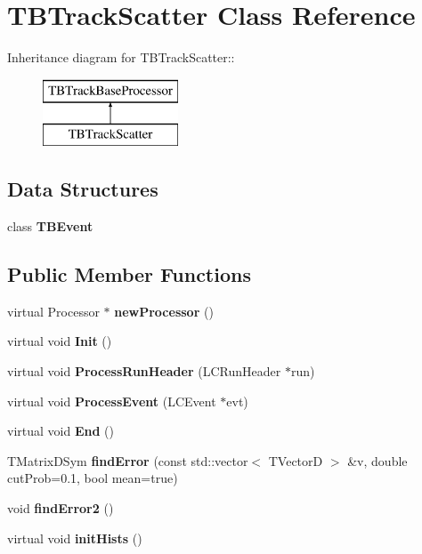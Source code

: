 \section{TBTrackScatter Class Reference}
\label{classTBTrackScatter}
Inheritance diagram for TBTrackScatter::\begin{figure}[H]
\begin{center}
\leavevmode
\includegraphics[height=2cm]{classTBTrackScatter}
\end{center}
\end{figure}
\subsection*{Data Structures}
\begin{DoxyCompactItemize}
\item 
class {\bf TBEvent}
\end{DoxyCompactItemize}
\subsection*{Public Member Functions}
\begin{DoxyCompactItemize}
\item 
virtual Processor $\ast$ {\bfseries newProcessor} ()\label{classTBTrackScatter_add1e78763f106644f161ba177f5f21e3}

\item 
virtual void {\bfseries Init} ()\label{classTBTrackScatter_a82431b4518ed55dbdf953ac15cdfc710}

\item 
virtual void {\bfseries ProcessRunHeader} (LCRunHeader $\ast$run)\label{classTBTrackScatter_ae27794c29359577e8278753bb7c74ead}

\item 
virtual void {\bfseries ProcessEvent} (LCEvent $\ast$evt)\label{classTBTrackScatter_a328a0b121402a3779882e39ecc575934}

\item 
virtual void {\bfseries End} ()\label{classTBTrackScatter_a1c5d977fb520115d85706dd7f3794edd}

\item 
TMatrixDSym {\bfseries findError} (const std::vector$<$ TVectorD $>$ \&v, double cutProb=0.1, bool mean=true)\label{classTBTrackScatter_aa6ff59b2691627b05c8726740215c81a}

\item 
void {\bfseries findError2} ()\label{classTBTrackScatter_a4350eab83583bce7b782f95bf9ffca20}

\item 
virtual void {\bfseries initHists} ()\label{classTBTrackScatter_ac27b4d5c266645c0b7869ec8301bb6af}

\end{DoxyCompactItemize}
